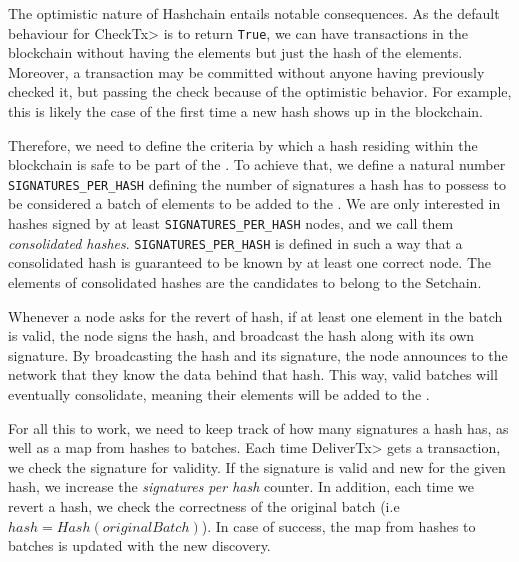 %
The optimistic nature of Hashchain entails notable consequences.
%
As the default behaviour for \<CheckTx> is to return \texttt{True},
we can have transactions in the blockchain without having the elements
but just the hash of the elements.
%
Moreover, a transaction may be committed without anyone having
previously checked it, but passing the check because of the optimistic
behavior.
%
For example, this is likely the case of the first time a new hash shows
up in the blockchain.

%

Therefore, we need to define the criteria by which a hash residing within the
blockchain is safe to be part of the \setchain.
%
To achieve that, we define a natural number \texttt{SIGNATURES\_PER\_HASH}
defining the number of signatures a hash has to possess to be considered a batch
of elements to be added to the \setchain.
%
We are only interested in hashes signed by at least
\texttt{SIGNATURES\_PER\_HASH} nodes, and we call them
%
\textit{consolidated hashes}.
%
\texttt{SIGNATURES\_PER\_HASH} is defined in such a way that a consolidated hash
is guaranteed to be known by at least one correct node.
%
The elements of consolidated hashes are the candidates to belong to the
Setchain.

%
Whenever a node asks for the revert of hash, if at least one element in the batch
is valid, the node signs the hash, and broadcast the hash along with its own signature.
%
By broadcasting the hash and its signature, the node announces to the network
that they know the data behind that hash.
%
This way, valid batches will eventually consolidate, meaning their elements will
be added to the \setchain.

For all this to work, we need to keep track of how many signatures a hash has,
as well as a map from hashes to batches.
%
Each time \<DeliverTx> gets a transaction, we check the
signature for validity.
%
If the signature is valid and new for the given hash, we increase the
\textit{signatures per hash} counter.
%
In addition, each time we revert a hash, we check the correctness of the
original batch (i.e $hash = Hash(originalBatch)$).
In case of success, the map from hashes to
batches is updated with the new discovery.

